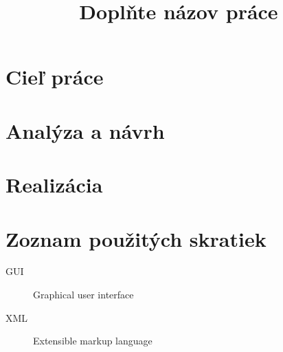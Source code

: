 \documentclass[thesis=B,slovak]{FITthesis}[2013/05/06]
\title{Doplňte názov práce}
\begin{document}

\begin{introduction}
\end{introduction}

\chapter{Cieľ práce}

\chapter{Analýza a návrh}

\chapter{Realizácia}

\begin{conclusion}
\end{conclusion}




\appendix

\chapter{Zoznam použitých skratiek}
\begin{description}
	\item[GUI] Graphical user interface
	\item[XML] Extensible markup language
\end{description}
\end{document}
